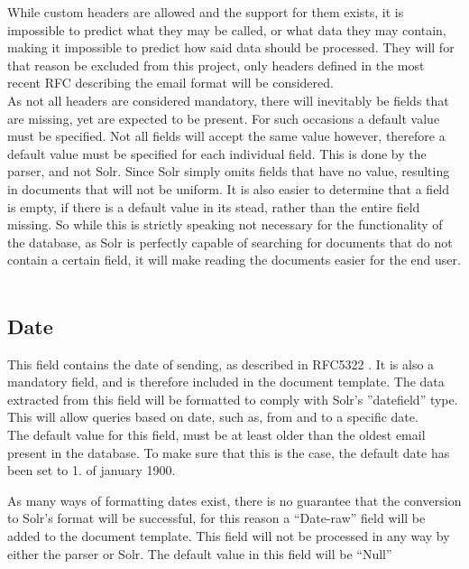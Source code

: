 \documentclass[a4paper,english]{report}
\begin{document}
While custom headers are allowed and the support for them exists, it is impossible to predict what they may be called, or what data they may contain, making it impossible to predict how said data should be processed. They will for that reason be excluded from this project, only headers defined in the most recent RFC describing the email format will be considered.
\\
As not all headers are considered mandatory, there will inevitably be fields that are missing, yet are expected to be present. For such occasions a default value must be specified. Not all fields will accept the same value however, therefore a default value must be specified for each individual field. This is done by the parser, and not Solr. Since Solr simply omits fields that have no value, resulting in documents that will not be uniform.
It is also easier to determine that a field is empty, if there is a default value in its stead, rather than the entire field missing. So while this is strictly speaking not necessary for the functionality of the database, as Solr is perfectly capable of searching for documents that do not contain a certain field, it will make reading the documents easier for the end user.\\\\



\noindent
\subsection{Date}
This field contains the date of sending, as described in RFC5322 \cite{RFC5322}. It is also a mandatory field, and is therefore included in the document template. The data extracted from this field will be formatted to comply with Solr's ”datefield” type. This will allow queries based on date, such as, from and to a specific date.
\\
The default value for this field, must be at least older than the oldest email present in the database. To make sure that this is the case, the default date has been set to 1. of january 1900.

As many ways of formatting dates exist, there is no guarantee that the conversion to Solr's format will be successful, for this reason a “Date-raw” field will be added to the document template. This field will not be processed in any way by either the parser or Solr.
The default value in this field will be “Null”\\\\
\end{document}
